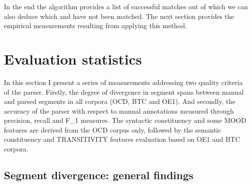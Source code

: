     In the end the algorithm provides a list of successful matches out of which we can also deduce which \aslist and \mslist have not been matched. The next section provides the empirical measurements resulting from applying this method. 

\section{Evaluation statistics}
\label{sec:results}

    In this section I present a series of measurements addressing two quality criteria of the parser. Firstly, the degree of divergence in segment spans between manual and parsed segments in all corpora (OCD, BTC and OE1). And secondly, the accuracy of the parser with respect to manual annotations measured through precision, recall and F_1 measures. The syntactic constituency and some MOOD features are derived from the OCD corpus only, followed by the semantic constituency and TRANSITIVITY features evaluation based on OE1 and BTC corpora. 

\subsection{Segment divergence: general findings}

    

